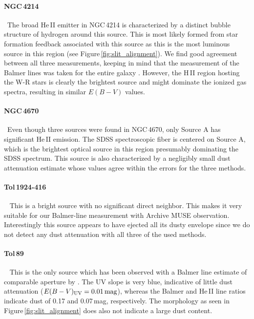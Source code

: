 \documentclass[linenumbers]{aastex63}
\begin{document}
\paragraph{NGC\,4214~}~The broad He\,II emitter in NGC\,4214 is characterized by a distinct bubble structure of hydrogen around this source. This is most likely formed from star formation feedback associated with this source as this is the most luminous source in this region (see Figure\,\ref{fig:slit_alignment}).
We find good agreement between all three measurements, keeping in mind that the measurement of the Balmer lines was taken for the entire galaxy \citep{moustakas_integrated_2006}. However, the H\,II region hosting the W-R stars is clearly the brightest source and might dominate the ionized gas spectra, resulting in similar $E(B-V)$ values.

\paragraph{NGC\,4670~}~Even though three sources were found in NGC\,4670, only Source A has significant He\,II emission. The SDSS spectroscopic fiber is centered on Source A, which is the brightest optical source in this region presumably dominating the SDSS spectrum. This source is also characterized by a negligibly small dust attenuation estimate whose values agree within the errors for the three methods. 

\paragraph{Tol\,1924-416~}~
This is a bright source with no significant direct neighbor. This makes it very suitable for our Balmer-line measurement with Archive MUSE observation. Interestingly this source appears to have ejected all its dusty envelope since we do not detect any dust attenuation with all three of the used methods.

\paragraph{Tol\,89~}~
This is the only source which has been observed with a Balmer line estimate of comparable aperture by \citet{sidoli_massive_2006}. 
The UV slope is very blue, indicative of little dust attenuation ($E(B-V){\rm _{UV} = 0.01\,mag}$), whereas the Balmer and He\,II line ratios indicate dust of 0.17 and 0.07\,mag, respectively. The morphology as seen in Figure\,\ref{fig:slit_alignment} does also not indicate a large dust content.
\end{document}
